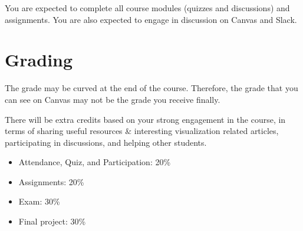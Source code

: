 \documentclass[11pt,article,oneside]{memoir} %
\begin{document}
You are expected to complete all course modules (quizzes and discussions) and assignments. You are also expected to engage in discussion on Canvas and Slack. 



\section{Grading}\label{sec:grading_tentative_}%

The grade may be curved at the end of the course. Therefore, the grade that you can see on Canvas may not be the grade you receive finally. 

There will be extra credits based on your strong engagement in the course, in terms of sharing useful resources \& interesting visualization related articles, participating in discussions, and helping other students.

\begin{itemize}%

\item Attendance, Quiz, and Participation: 20\%

\item Assignments: 20\% 

\item Exam: 30\%

\item Final project: 30\%

\end{itemize}%
\end{document}
